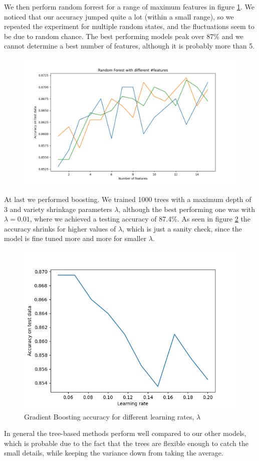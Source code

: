 We then perform random forrest for a range of maximum features in figure \ref{fig:randomforrest}. We noticed that our accuracy jumped quite a lot (within a small range), so we repeated the experiment for multiple random states, and the fluctuations seem to be due to random chance. The best performing models peak over 87\% and we cannot determine a best number of features, although it is probably more than 5.


\begin{figure}[h!]
    \centering
    \includegraphics[width=0.75\columnwidth]{Plots/RandomForest.png}
    \caption{}
    \label{fig:randomforrest}
\end{figure}


At last we performed boosting. We trained 1000 trees with a maximum depth of 3 and variety shrinkage parameters $\lambda$, although the best performing one was with $\lambda = 0.01$, where we achieved a testing accuracy of 87.4\%. As seen in figure \ref{fig:accuracyvslambda} the accuracy shrinks for higher values of $\lambda$, which is just a sanity check, since the model is fine tuned more and more for smaller $\lambda$.


\begin{figure}[h!]
    \centering
    \includegraphics[width=0.75\columnwidth]{Plots/GradientBoosting.png}
    \caption{Gradient Boosting accuracy for different learning rates, $\lambda$}
    \label{fig:accuracyvslambda}
\end{figure}


In general the tree-based methods perform well compared to our other models, which is probable due to the fact that the trees are flexible enough to catch the small details, while keeping the variance down from taking the average.